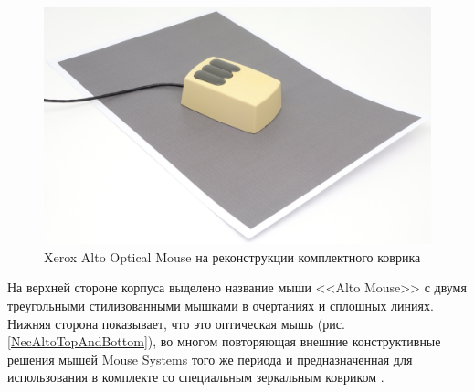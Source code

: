 \documentclass[11pt, a4paper]{article}
\begin{document}
\begin{figure}[h]
    \centering
    \includegraphics[scale=0.4]{1981_xerox_alto_mouse/pad_30.jpg}
    \caption{Xerox Alto Optical Mouse на реконструкции комплектного коврика}
    \label{fig:XeroxAltoPad}
\end{figure}

На верхней стороне корпуса выделено название мыши <<Alto Mouse>> с двумя треугольными стилизованными мышками в очертаниях и сплошных линиях. Нижняя сторона показывает, что это оптическая мышь (рис. \ref{NecAltoTopAndBottom}), во многом повторяющая внешние конструктивные решения мышей Mouse Systems того же периода и предназначенная для использования в комплекте со специальным зеркальным ковриком \cite{photo}.
\end{document}
